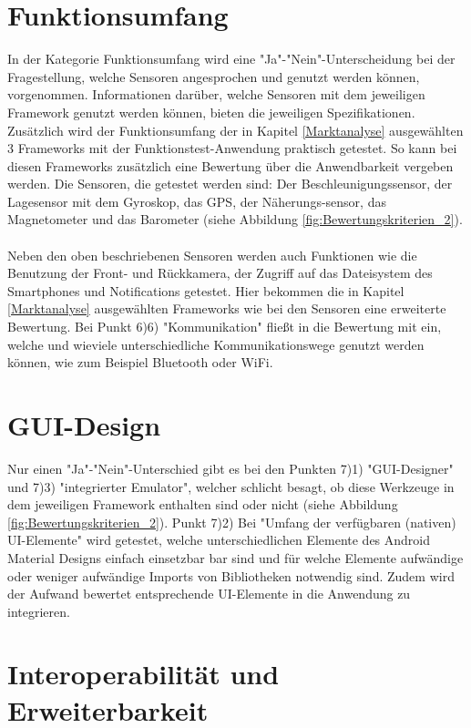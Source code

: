 \section{Funktionsumfang}

In der Kategorie Funktionsumfang wird eine "Ja"-"Nein"-Unterscheidung bei der Fragestellung, welche Sensoren angesprochen und genutzt werden können, vorgenommen. Informationen darüber, welche Sensoren mit dem jeweiligen Framework genutzt werden können, bieten die jeweiligen Spezifikationen. Zusätzlich wird der Funktionsumfang der in Kapitel \ref{Marktanalyse} ausgewählten 3 Frameworks mit der Funktionstest-Anwendung praktisch getestet. So kann bei diesen Frameworks zusätzlich eine Bewertung über die Anwendbarkeit vergeben werden. Die Sensoren, die getestet werden sind: Der Beschleunigungssensor, der Lagesensor mit dem Gyroskop, das GPS, der Näherungs-sensor, das Magnetometer und das Barometer (siehe Abbildung \ref{fig:Bewertungskriterien_2}). 
\\
\\
Neben den oben beschriebenen Sensoren werden auch Funktionen wie die Benutzung der Front- und Rückkamera, der Zugriff auf das Dateisystem des Smartphones und Notifications getestet. Hier bekommen die in Kapitel \ref{Marktanalyse} ausgewählten Frameworks wie bei den Sensoren eine erweiterte Bewertung. Bei Punkt 6)6) "Kommunikation" fließt in die Bewertung mit ein, welche und wieviele unterschiedliche Kommunikationswege genutzt werden können, wie zum Beispiel Bluetooth oder WiFi. 

\section{GUI-Design}

Nur einen "Ja"-"Nein"-Unterschied gibt es bei den Punkten 7)1) "GUI-Designer" und 7)3) "integrierter Emulator", welcher schlicht besagt, ob diese Werkzeuge in dem jeweiligen Framework enthalten sind oder nicht (siehe Abbildung \ref{fig:Bewertungskriterien_2}). Punkt 7)2) Bei "Umfang der verfügbaren (nativen) UI-Elemente" wird getestet, welche unterschiedlichen Elemente des Android Material Designs einfach einsetzbar bar sind und für welche Elemente aufwändige oder weniger aufwändige Imports von Bibliotheken notwendig sind. Zudem wird der Aufwand bewertet entsprechende UI-Elemente in die Anwendung zu integrieren. 

\section{Interoperabilität und Erweiterbarkeit}

